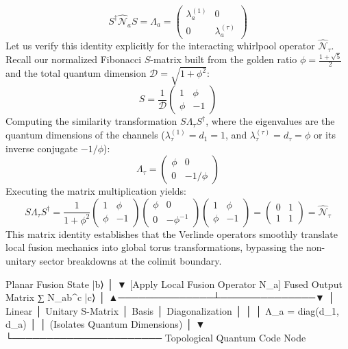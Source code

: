 $$S^\dagger \hat{\mathcal{N}}_a S = \Lambda_a = \begin{pmatrix} \lambda_{a}^{(1)} & 0 \\ 0 & \lambda_{a}^{(\tau)} \end{pmatrix}$$ 
Let us verify this identity explicitly for the interacting whirlpool operator $\hat{\mathcal{N}}_\tau$. Recall our normalized Fibonacci $S$-matrix built from the golden ratio $\phi = \frac{1+\sqrt{5}}{2}$ and the total quantum dimension $\mathcal{D} = \sqrt{1+\phi^2}$:
$$S = \frac{1}{\mathcal{D}} \begin{pmatrix} 1 & \phi \\ \phi & -1 \end{pmatrix}$$ 
Computing the similarity transformation $S \Lambda_\tau S^\dagger$, where the eigenvalues are the quantum dimensions of the channels ($\lambda_\tau^{(1)} = d_1 = 1$, and $\lambda_\tau^{(\tau)} = d_\tau = \phi$ or its inverse conjugate $-1/\phi$):
$$\Lambda_\tau = \begin{pmatrix} \phi & 0 \\ 0 & -1/\phi \end{pmatrix}$$ 
Executing the matrix multiplication yields:
$$S \Lambda_\tau S^\dagger = \frac{1}{1+\phi^2} \begin{pmatrix} 1 & \phi \\ \phi & -1 \end{pmatrix} \begin{pmatrix} \phi & 0 \\ 0 & -\phi^{-1} \end{pmatrix} \begin{pmatrix} 1 & \phi \\ \phi & -1 \end{pmatrix} = \begin{pmatrix} 0 & 1 \\ 1 & 1 \end{pmatrix} = \hat{\mathcal{N}}_\tau$$ 
This matrix identity establishes that the Verlinde operators smoothly translate local fusion mechanics into global torus transformations, bypassing the non-unitary sector breakdowns at the colimit boundary.

          Planar Fusion State |b⟩
                   │
                   ▼  [Apply Local Fusion Operator N_a]
           Fused Output Matrix ∑ N_ab^c |c⟩
                   │
    ▲──────────────┴──────────────▼
    │ Linear                      │ Unitary S-Matrix
    │ Basis                       │ Diagonalization
    │                             │
    │                      Λ_a = diag(d_1, d_a)
    │                             │  (Isolates Quantum Dimensions)
    │                             ▼
    └────────────────────── Topological Quantum Code Node

